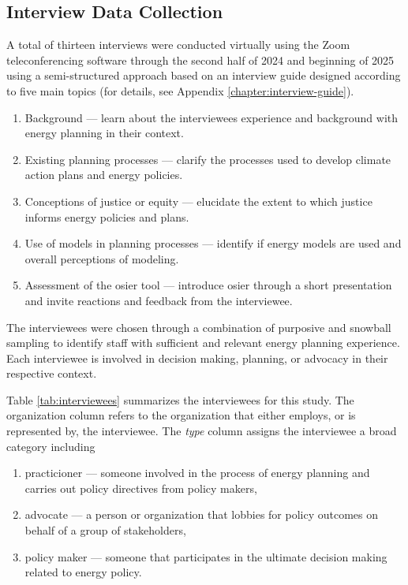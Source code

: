 \subsection{Interview Data Collection}

A total of thirteen interviews were conducted virtually using the Zoom
teleconferencing software through the second half of 2024 and beginning of 2025
using a semi-structured approach based on an interview guide designed according
to five main topics (for details, see Appendix \ref{chapter:interview-guide}).
\begin{enumerate}
    \item Background --- learn about the interviewees experience and background
    with energy planning in their context.
    \item Existing planning processes --- clarify the processes used to develop
    climate action plans and energy policies.
    \item Conceptions of justice or equity --- elucidate the extent to which
    justice informs energy policies and plans.
    \item Use of models in planning processes --- identify if energy models are
    used and overall perceptions of modeling.
    \item Assessment of the \ac{osier} tool --- introduce \ac{osier} through a
    short presentation and invite reactions and feedback from the interviewee.
\end{enumerate}
The interviewees were chosen through a combination of purposive and snowball
sampling to identify staff with sufficient and relevant energy planning
experience. Each interviewee is involved in decision making, planning, or
advocacy in their respective context. 

Table \ref{tab:interviewees} summarizes the interviewees for this study. The
organization column refers to the organization that either employs, or is
represented by, the interviewee. The \textit{type} column assigns the
interviewee a broad category including
\begin{enumerate}
    \item practicioner --- someone involved in the process of energy planning
    and carries out policy directives from policy makers,
    \item advocate --- a person or organization that lobbies for policy outcomes
    on behalf of a group of stakeholders,
    \item policy maker --- someone that participates in the ultimate decision
    making related to energy policy.
\end{enumerate}
    
